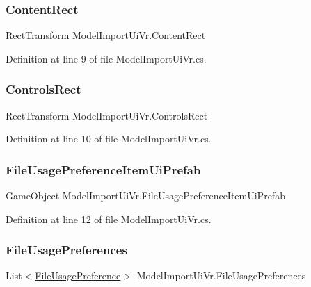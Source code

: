 \subsubsection{\texorpdfstring{ContentRect}{ContentRect}}
{\footnotesize\ttfamily Rect\+Transform Model\+Import\+Ui\+Vr.\+Content\+Rect}



Definition at line 9 of file Model\+Import\+Ui\+Vr.\+cs.

\mbox{\label{class_model_import_ui_vr_a2f5d329583de1c44327e65f5ed4ce302}} 
\subsubsection{\texorpdfstring{ControlsRect}{ControlsRect}}
{\footnotesize\ttfamily Rect\+Transform Model\+Import\+Ui\+Vr.\+Controls\+Rect}



Definition at line 10 of file Model\+Import\+Ui\+Vr.\+cs.

\mbox{\label{class_model_import_ui_vr_a379fe882068c6dd8b44320ac64164cf3}} 
\subsubsection{\texorpdfstring{FileUsagePreferenceItemUiPrefab}{FileUsagePreferenceItemUiPrefab}}
{\footnotesize\ttfamily Game\+Object Model\+Import\+Ui\+Vr.\+File\+Usage\+Preference\+Item\+Ui\+Prefab}



Definition at line 12 of file Model\+Import\+Ui\+Vr.\+cs.

\mbox{\label{class_model_import_ui_vr_a993eba8f0736dedb38513206772e011b}} 
\subsubsection{\texorpdfstring{FileUsagePreferences}{FileUsagePreferences}}
{\footnotesize\ttfamily List$<$\mbox{\hyperlink{class_file_usage_preference}{File\+Usage\+Preference}}$>$ Model\+Import\+Ui\+Vr.\+File\+Usage\+Preferences}



